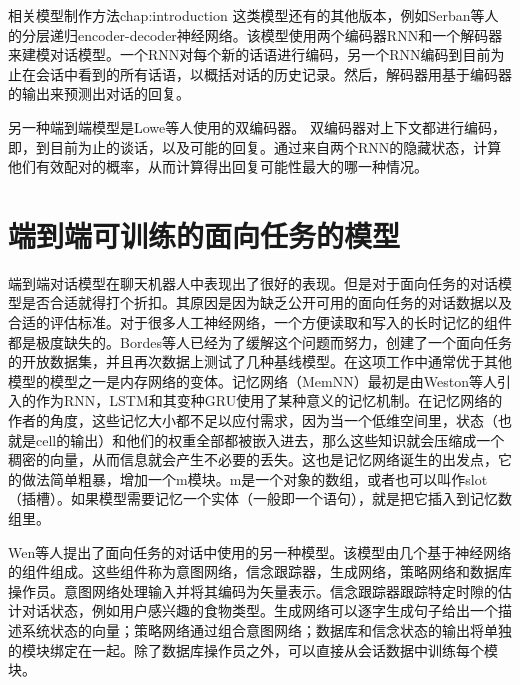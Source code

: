 \begin{cuzchapter}{相关模型制作方法}{chap:introduction}
这类模型还有的其他版本，例如Serban等人的分层递归encoder-decoder神经网络\cite{Serban2016Building}。该模型使用两个编码器RNN和一个解码器来建模对话模型。一个RNN对每个新的话语进行编码，另一个RNN编码到目前为止在会话中看到的所有话语，以概括对话的历史记录。然后，解码器用基于编码器的输出来预测出对话的回复。

另一种端到端模型是Lowe等人使用的双编码器\cite{DDUbuntu}。 双编码器对上下文都进行编码，即，到目前为止的谈话，以及可能的回复。通过来自两个RNN的隐藏状态，计算他们有效配对的概率，从而计算得出回复可能性最大的哪一种情况。
\section{端到端可训练的面向任务的模型}\label{sec:background}
端到端对话模型在聊天机器人中表现出了很好的表现。但是对于面向任务的对话模型是否合适就得打个折扣。其原因是因为缺乏公开可用的面向任务的对话数据以及合适的评估标准。对于很多人工神经网络，一个方便读取和写入的长时记忆的组件都是极度缺失的。Bordes等人已经为了缓解这个问题而努力，创建了一个面向任务的开放数据集，并且再次数据上测试了几种基线模型。在这项工作中通常优于其他模型的模型之一是内存网络的变体。记忆网络（MemNN）\cite{DBLP:journals/corr/MemoryNetworks}最初是由Weston等人引入的作为RNN，LSTM和其变种GRU使用了某种意义的记忆机制。在记忆网络的作者的角度，这些记忆大小都不足以应付需求，因为当一个低维空间里，状态（也就是cell的输出）和他们的权重全部都被嵌入进去，那么这些知识就会压缩成一个稠密的向量，从而信息就会产生不必要的丢失。这也是记忆网络诞生的出发点，它的做法简单粗暴，增加一个m模块。m是一个对象的数组，或者也可以叫作slot（插槽）。如果模型需要记忆一个实体（一般即一个语句），就是把它插入到记忆数组里。

Wen等人提出了面向任务的对话中使用的另一种模型\cite{DBLP:journals/corr/WenGMRSUVY16}。该模型由几个基于神经网络的组件组成。这些组件称为意图网络，信念跟踪器，生成网络，策略网络和数据库操作员\cite{Wen2017A}。意图网络处理输入并将其编码为矢量表示。信念跟踪器跟踪特定时隙的估计对话状态，例如用户感兴趣的食物类型。生成网络可以逐字生成句子给出一个描述系统状态的向量；策略网络通过组合意图网络；数据库和信念状态的输出将单独的模块绑定在一起。除了数据库操作员之外，可以直接从会话数据中训练每个模块。
\end{cuzchapter}
